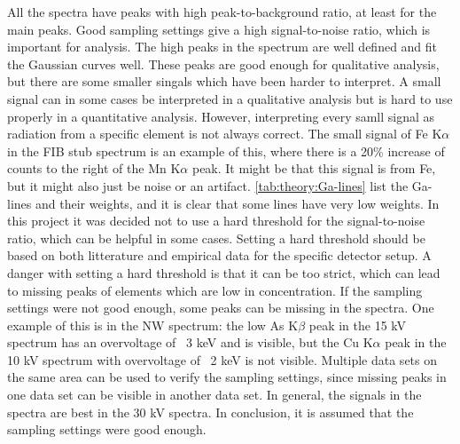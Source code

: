 All the spectra have peaks with high peak-to-background ratio, at least for the main peaks. %
Good sampling settings give a high signal-to-noise ratio, which is important for analysis.
The high peaks in the spectrum are well defined and fit the Gaussian curves well.
These peaks are good enough for qualitative analysis, but there are some smaller singals which have been harder to interpret.
A small signal can in some cases be interpreted in a qualitative analysis but is hard to use properly in a quantitative analysis.
However, interpreting every samll signal as radiation from a specific element is not always correct.
The small signal of Fe K$\alpha$ in the FIB stub spectrum is an example of this, where there is a 20\% increase of counts to the right of the Mn K$\alpha$ peak.
It might be that this signal is from Fe, but it might also just be noise or an artifact.
\cref{tab:theory:Ga-lines} list the Ga-lines and their weights, and it is clear that some lines have very low weights.
In this project it was decided not to use a hard threshold for the signal-to-noise ratio, which can be helpful in some cases.
Setting a hard threshold should be based on both litterature and empirical data for the specific detector setup.
A danger with setting a hard threshold is that it can be too strict, which can lead to missing peaks of elements which are low in concentration.
If the sampling settings were not good enough, some peaks can be missing in the spectra.
One example of this is in the NW spectrum: the low As K$\beta$ peak in the 15 kV spectrum has an overvoltage of ~3 keV and is visible, but the Cu K$\alpha$ peak in the 10 kV spectrum with overvoltage of ~2 keV is not visible.
Multiple data sets on the same area can be used to verify the sampling settings, since missing peaks in one data set can be visible in another data set.
In general, the signals in the spectra are best in the 30 kV spectra.
In conclusion, it is assumed that the sampling settings were good enough.



